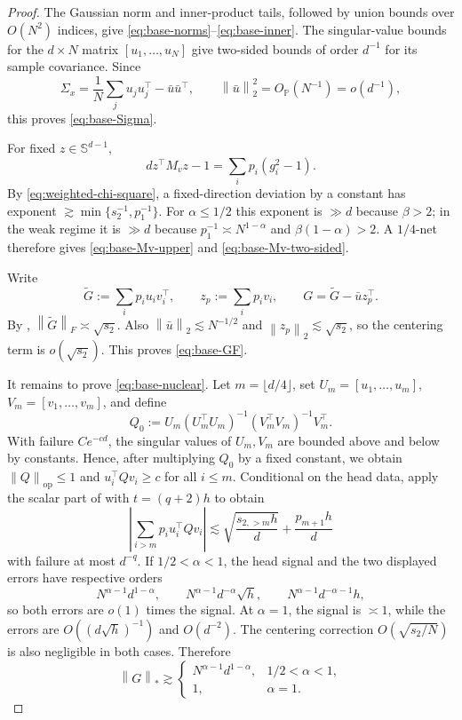 \documentclass[11pt]{article}
\theoremstyle{definition}
\newcommand{\Pp}{\mathbb P}
\newcommand{\norm}[1]{\left\lVert #1\right\rVert_2}
\newcommand{\normF}[1]{\left\lVert #1\right\rVert_F}
\newcommand{\normop}[1]{\left\lVert #1\right\rVert_{\mathrm{op}}}
\newcommand{\normnuc}[1]{\left\lVert #1\right\rVert_*}
\begin{document}
\begin{proof}
The Gaussian norm and inner-product tails, followed by union bounds over
$O(N^2)$ indices, give \eqref{eq:base-norms}--\eqref{eq:base-inner}.
The singular-value bounds for the $d\times N$ matrix
$[u_1,\ldots,u_N]$ give two-sided bounds of order $d^{-1}$ for its
sample covariance.  Since
\[
 \Sigma_x=\frac1N\sum_j u_ju_j^\top-\bar u\bar u^\top,
 \qquad \norm{\bar u}^2=O_{\Pp}(N^{-1})=o(d^{-1}),
\]
this proves \eqref{eq:base-Sigma}.

For fixed $z\in\mathbb S^{d-1}$,
\[
 d z^\top M_vz-1=\sum_i p_i(g_i^2-1).
\]
By \eqref{eq:weighted-chi-square}, a fixed-direction deviation by a
constant has exponent
$\gtrsim\min\{s_2^{-1},p_1^{-1}\}$.  For $\alpha\leq1/2$ this exponent
is $\gg d$ because $\beta>2$; in the weak regime it is $\gg d$ because
$p_1^{-1}\asymp N^{1-\alpha}$ and $\beta(1-\alpha)>2$.  A $1/4$-net
therefore gives \eqref{eq:base-Mv-upper} and
\eqref{eq:base-Mv-two-sided}.

Write
\[
 \widetilde G:=\sum_i p_i u_iv_i^\top,
 \qquad z_p:=\sum_i p_i v_i,
 \qquad G=\widetilde G-\bar u z_p^\top.
\]
By ,
$\normF{\widetilde G}\asymp\sqrt{s_2}$.  Also
$\norm{\bar u}\lesssim N^{-1/2}$ and
$\norm{z_p}\lesssim\sqrt{s_2}$, so the centering term is
$o(\sqrt{s_2})$.  This proves \eqref{eq:base-GF}.

It remains to prove \eqref{eq:base-nuclear}.  Let
$m=\lfloor d/4\rfloor$, set
$U_m=[u_1,\ldots,u_m]$, $V_m=[v_1,\ldots,v_m]$, and define
\[
 Q_0:=U_m(U_m^\top U_m)^{-1}(V_m^\top V_m)^{-1}V_m^\top.
\]
With failure $Ce^{-cd}$, the singular values of $U_m,V_m$ are bounded
above and below by constants.  Hence, after multiplying $Q_0$ by a fixed
constant, we obtain $\normop{Q}\leq1$ and
$u_i^\top Qv_i\geq c$ for all $i\leq m$.  Conditional on the head data, apply the scalar part of
 with $t=(q+2)h$ to obtain
\[
 \left|\sum_{i>m}p_i u_i^\top Qv_i\right|
 \lesssim
 \sqrt{\frac{s_{2,>m}h}{d}}+\frac{p_{m+1}h}{d}
\]
with failure at most $d^{-q}$.  If $1/2<\alpha<1$, the head signal and
the two displayed errors have respective orders
\[
 N^{\alpha-1}d^{1-\alpha},\qquad
 N^{\alpha-1}d^{-\alpha}\sqrt h,
 \qquad N^{\alpha-1}d^{-\alpha-1}h,
\]
so both errors are $o(1)$ times the signal.  At $\alpha=1$, the signal
is $\asymp1$, while the errors are
$O((d\sqrt h)^{-1})$ and $O(d^{-2})$.  The centering correction
$O(\sqrt{s_2/N})$ is also negligible in both cases.  Therefore
\begin{equation}
 \normnuc{G}\gtrsim
 \begin{cases}
 N^{\alpha-1}d^{1-\alpha},&1/2<\alpha<1,\\
 1,&\alpha=1.
 \end{cases}
 \label{eq:nuclear-lower-head}
\end{equation}


\end{proof}
\end{document}
